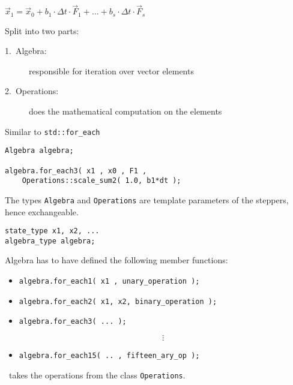\begin{frame}[fragile]

\centerline{$\vec x_1 = \vec x_0 + b_1\cdot \Delta t \cdot \vec F_1 + \dots + b_s\cdot \Delta t \cdot \vec F_s$}

\vspace{0.5em}

Split into two parts:

\begin{description}
 \item[1.~Algebra:] responsible for iteration over vector elements
 \item[2.~Operations:] does the mathematical computation on the elements
\end{description}

\vspace{0.5em}

Similar to \lstinline+std::for_each+

\begin{lstlisting}
Algebra algebra;

algebra.for_each3( x1 , x0 , F1 ,
    Operations::scale_sum2( 1.0, b1*dt );
\end{lstlisting}
\pause

The types \lstinline+Algebra+ and \lstinline+Operations+ are template parameters of the steppers, hence exchangeable.
\end{frame}


\begin{frame}[fragile]

\begin{lstlisting}
state_type x1, x2, ...
algebra_type algebra;
\end{lstlisting}

Algebra has to have defined the following member functions:

\begin{itemize}
 \item \lstinline+algebra.for_each1( x1 , unary_operation );+
 \item \lstinline+algebra.for_each2( x1, x2, binary_operation );+
 \item \lstinline+algebra.for_each3( ... );+

\[\vdots\]

 \item \lstinline+algebra.for_each15( .. , fifteen_ary_op );+
\end{itemize}

\pause
\odeint\ takes the operations from the class \lstinline+Operations+.

\end{frame}


